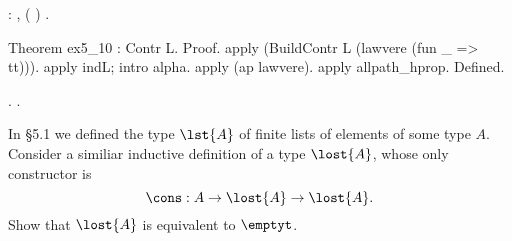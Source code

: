 \begin{coqdoccode}
\coqdocnoindent
{}  : \coqdockw{\ensuremath{\forall}}   ,    ( ) \coqdocnotation{=}  .\coqdoceol
\coqdocemptyline
\coqdocnoindent
\begin{coqdoccomment}
\coqdoceol
Theorem\coqdocindent{0.50em}
ex5\_10\coqdocindent{0.50em}
:\coqdocindent{0.50em}
Contr\coqdocindent{0.50em}
L.\coqdoceol
Proof.\coqdoceol
\coqdocindent{1.00em}
apply\coqdocindent{0.50em}
(BuildContr\coqdocindent{0.50em}
L\coqdocindent{0.50em}
(lawvere\coqdocindent{0.50em}
(fun\coqdocindent{0.50em}
\_\coqdocindent{0.50em}
=>\coqdocindent{0.50em}
tt))).\coqdoceol
\coqdocindent{1.00em}
apply\coqdocindent{0.50em}
indL;\coqdocindent{0.50em}
intro\coqdocindent{0.50em}
alpha.\coqdoceol
\coqdocindent{1.00em}
apply\coqdocindent{0.50em}
(ap\coqdocindent{0.50em}
lawvere).\coqdoceol
\coqdocindent{1.00em}
apply\coqdocindent{0.50em}
allpath\_hprop.\coqdoceol
Defined.\coqdoceol
\end{coqdoccomment}
\coqdoceol
\coqdocemptyline
\coqdocnoindent
{} .\coqdoceol
\coqdocnoindent
{} .\coqdoceol
\coqdocemptyline
\end{coqdoccode}
In \S5.1 we defined the type $\lst{A}$ of finite lists of elements of some
type $A$.  Consider a similiar inductive definition of a type $\lost{A}$, whose
only constructor is
\[
  \cons : A \to \lost{A} \to \lost{A}.
\]
Show that $\lost{A}$ is equivalent to $\emptyt$.


